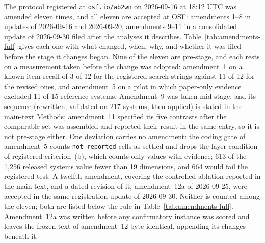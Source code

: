 
The protocol registered at \texttt{osf.io/ab2wn} on 2026-09-16 at 18:12 UTC was amended eleven times, and all
eleven are accepted at OSF: amendments 1--8 in updates of 2026-09-16 and 2026-09-20, amendments 9--11 in a
consolidated update of 2026-09-30 filed after the analyses it describes. Table~\ref{tab:amendments-full} gives each one with what changed, when,
why, and whether it was filed before the stage it changes began. Nine of the eleven are pre-stage, and each
rests on a measurement taken before the change was adopted: amendment~1 on a known-item recall of 3 of 12
for the registered search strings against 11 of 12 for the revised ones, and amendment~5 on a pilot in which
paper-only evidence excluded 11 of 15 reference systems. Amendment~9 was taken mid-stage, and its sequence
(rewritten, validated on 217 systems, then applied) is stated in the main-text Methods; amendment~11
specified its five contrasts after the comparable set was assembled and reported their result in the same
entry, so it is not pre-stage either. One deviation carries no amendment: the coding gate of
amendment~5 counts \texttt{not\_reported} cells as settled and drops the layer condition of registered
criterion~(b), which counts only values with evidence; 613 of the 1,256 released systems value fewer than
19 dimensions, and 664 would fail the registered test. A
twelfth amendment, covering the controlled ablation reported in the main text, and a dated revision of
it, amendment~12a of 2026-09-25, were accepted in the same registration update of 2026-09-30. Neither is counted
among the eleven; both are listed below the rule in Table~\ref{tab:amendments-full}. Amendment~12a was
written before any confirmatory instance was scored and leaves the frozen text of amendment~12
byte-identical, appending its changes beneath it.

